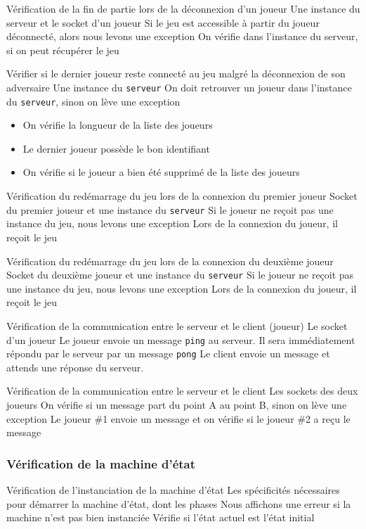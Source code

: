 \mytest
{Vérification de la fin de partie lors de la déconnexion d'un joueur}
{Une instance du serveur et le socket d'un joueur}
{Si le jeu est accessible à partir du joueur déconnecté, alors nous levons une exception}
{On vérifie dans l'instance du serveur, si on peut récupérer le jeu}

\mytest
{Vérifier si le dernier joueur reste connecté au jeu malgré la déconnexion de son adversaire}
{Une instance du \texttt{serveur}}
{On doit retrouver un joueur dans l'instance du \texttt{serveur}, sinon on lève une exception}
{
    \begin{itemize}
        \item On vérifie la longueur de la liste des joueurs
        \item Le dernier joueur possède le bon identifiant
        \item On vérifie si le joueur a bien été supprimé de la liste des joueurs
    \end{itemize}
}

\mytest
{Vérification du redémarrage du jeu lors de la connexion du premier joueur}
{Socket du premier joueur et une instance du \texttt{serveur}}
{Si le joueur ne reçoit pas une instance du jeu, nous levons une exception}
{Lors de la connexion du joueur, il reçoit le jeu}

\mytest
{Vérification du redémarrage du jeu lors de la connexion du deuxième joueur}
{Socket du deuxième joueur et une instance du \texttt{serveur}}
{Si le joueur ne reçoit pas une instance du jeu, nous levons une exception}
{Lors de la connexion du joueur, il reçoit le jeu}

\mytest
{Vérification de la communication entre le serveur et le client (joueur)}
{Le socket d'un joueur}
{Le joueur envoie un message \texttt{ping} au serveur. Il sera immédiatement répondu par le serveur par un message \texttt{pong}}
{Le client envoie un message et attends une réponse du serveur.}

\mytest
{Vérification de la communication entre le serveur et le client}
{Les sockets des deux joueurs}
{On vérifie si un message part du point A au point B, sinon on lève une exception}
{Le joueur \#1 envoie un message  et on vérifie si le joueur \#2 a reçu le message}

\subsubsection{Vérification de la machine d'état}
\mytest
{Vérification de l'instanciation de la machine d'état}
{Les spécificités nécessaires pour démarrer la machine d'état, dont les phases}
{Nous affichons une erreur si la machine n'est pas bien instanciée}
{Vérifie si l'état actuel est l'état initial}

